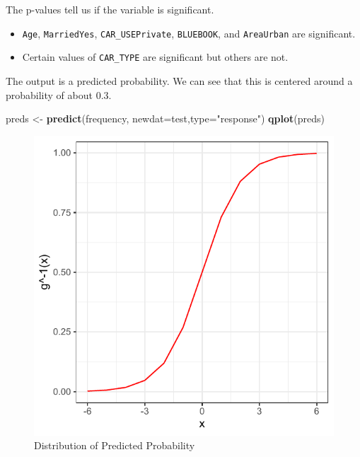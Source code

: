 \documentclass[
  openany]{book}
\newenvironment{Shaded}{\begin{snugshade}}{\end{snugshade}}
\newcommand{\DataTypeTok}[1]{\textcolor[rgb]{0.13,0.29,0.53}{#1}}
\newcommand{\KeywordTok}[1]{\textcolor[rgb]{0.13,0.29,0.53}{\textbf{#1}}}
\newcommand{\NormalTok}[1]{#1}
\newcommand{\StringTok}[1]{\textcolor[rgb]{0.31,0.60,0.02}{#1}}
\providecommand{\tightlist}{%
  \setlength{\itemsep}{0pt}\setlength{\parskip}{0pt}}
\begin{document}
The p-values tell us if the variable is significant.

\begin{itemize}
\tightlist
\item
  \texttt{Age}, \texttt{MarriedYes}, \texttt{CAR\_USEPrivate}, \texttt{BLUEBOOK}, and \texttt{AreaUrban} are significant.
\item
  Certain values of \texttt{CAR\_TYPE} are significant but others are not.
\end{itemize}

The output is a predicted probability. We can see that this is centered around a probability of about 0.3.

\begin{Shaded}
\begin{Highlighting}[]
\NormalTok{preds <-}\StringTok{ }\KeywordTok{predict}\NormalTok{(frequency, }\DataTypeTok{newdat=}\NormalTok{test,}\DataTypeTok{type=}\StringTok{"response"}\NormalTok{)}
\KeywordTok{qplot}\NormalTok{(preds) }
\end{Highlighting}
\end{Shaded}

\begin{figure}
\centering
\includegraphics{05-linear-models_files/figure-latex/unnamed-chunk-25-1.pdf}
\caption{\label{fig:unnamed-chunk-25}Distribution of Predicted Probability}
\end{figure}
\end{document}
